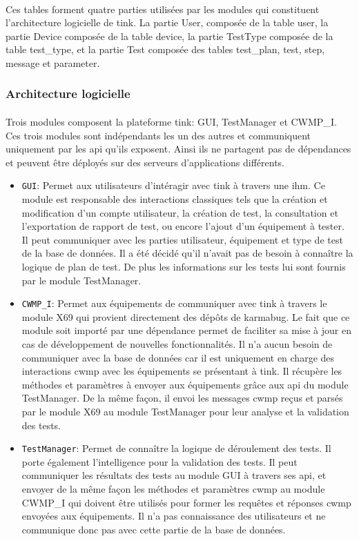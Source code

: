 \documentclass[12pt,a4paper]{report}
\begin{document}
\paragraph*{}Ces tables forment quatre parties utilisées par les modules qui constituent l'architecture logicielle de \gls{tink}. La partie User, composée de la table user, la partie Device composée de la table device, la partie TestType composée de la table test\_type, et la partie Test composée des tables test\_plan, test, step, message et parameter. \\
\newpage
\subsubsection{Architecture logicielle}
\paragraph*{}Trois modules composent la plateforme \gls{tink}: GUI, TestManager et CWMP\_I. Ces trois modules sont indépendants les un des autres et communiquent uniquement par les \gls{api} qu'ils exposent. Ainsi ils ne partagent pas de dépendances et peuvent être déployés sur des serveurs d'applications différents. 
\begin{itemize}
\item \texttt{GUI}: Permet aux utilisateurs d'intéragir avec \gls{tink} à travers une \gls{ihm}. Ce module est responsable des interactions classiques tels que la création et modification d'un compte utilisateur, la création de test, la consultation et l'exportation de rapport de test, ou encore l'ajout d'un équipement à tester. Il peut communiquer avec les parties utilisateur, équipement et type de test de la base de données. Il a été décidé qu'il n'avait pas de besoin à connaître la logique de plan de test. De plus les informations sur les tests lui sont fournis par le module TestManager. 
\item \texttt{CWMP\_I}: Permet aux équipements de communiquer avec \gls{tink} à travers le module X69 qui provient directement des dépôts de \gls{karmabug}. Le fait que ce module soit importé par une dépendance permet de faciliter sa mise à jour en cas de développement de nouvelles fonctionnalités. Il n'a aucun besoin de communiquer avec la base de données car il est uniquement en charge des interactions \gls{cwmp} avec les équipements se présentant à \gls{tink}. Il récupère les méthodes et paramètres à envoyer aux équipements grâce aux \gls{api} du module TestManager. De la même façon, il envoi les messages \gls{cwmp} reçus et parsés par le module X69 au module TestManager pour leur analyse et la validation des tests. 
\item \texttt{TestManager}: Permet de connaître la logique de déroulement des tests. Il porte également l'intelligence pour la validation des tests. Il peut communiquer les résultats des tests au module GUI à travers ses \gls{api}, et envoyer de la même façon les méthodes et paramètres \gls{cwmp} au module CWMP\_I qui doivent être utilisés pour former les requêtes et réponses \gls{cwmp} envoyées aux équipements. Il n'a pas connaissance des utilisateurs et ne communique donc pas avec cette partie de la base de données.
\end{itemize}
\end{document}

